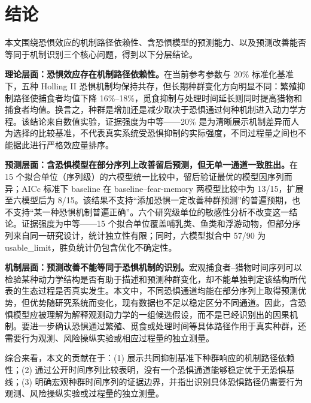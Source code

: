 \documentclass[12pt,a4paper]{ctexart}
\begin{document}
\section{结论}

本文围绕恐惧效应的机制路径依赖性、含恐惧模型的预测能力、以及预测改善能否等同于机制识别三个核心问题，得到以下分层结论。

\textbf{理论层面：恐惧效应存在机制路径依赖性。}在当前参考参数与 20\% 标准化基准下，五种 Holling II 恐惧机制均保持共存，但长期种群变化方向明显不同：繁殖抑制路径使捕食者均值下降 16\%--18\%，觅食抑制与处理时间延长则同时提高猎物和捕食者均值。换言之，种群是增加还是减少取决于恐惧通过何种机制进入动力学方程。该结论来自数值实验，证据强度为中等——20\% 是为清晰展示机制差异而人为选择的比较基准，不代表真实系统受恐惧抑制的实际强度，不同过程量之间也不能据此进行严格效应量排序。

\textbf{预测层面：含恐惧模型在部分序列上改善留后预测，但无单一通道一致胜出。}在 15 个拟合单位（序列级）的六模型统一比较中，留后验证最优的模型因序列而异；AICc 标准下 baseline 在 baseline--fear-memory 两模型比较中为 13/15，扩展至六模型后为 8/15。该结果不支持“添加恐惧一定改善种群预测”的普遍预期，也不支持“某一种恐惧机制普遍正确”。六个研究级单位的敏感性分析不改变这一结论。证据强度为中等——15 个拟合单位覆盖哺乳类、鱼类和浮游动物，但部分序列来自同一研究设计，统计独立性有限；同时，六模型拟合中 57/90 为 usable\_limit，胜负统计仍包含优化不确定性。

\textbf{机制层面：预测改善不能等同于恐惧机制的识别。}宏观捕食者--猎物时间序列可以检验某种动力学结构是否有助于描述和预测种群变化，却不能单独判定该结构所代表的生态过程是否真实发生。本文中，不同恐惧通道均能在部分序列上取得预测优势，但优势随研究系统而变化，现有数据也不足以稳定区分不同通道。因此，含恐惧模型应被理解为解释观测动力学的一组候选假设，而不是已经识别出的因果机制。要进一步确认恐惧通过繁殖、觅食或处理时间等具体路径作用于真实种群，还需要行为观测、风险操纵实验或相应过程量的独立测量。

综合来看，本文的贡献在于：(1) 展示共同抑制基准下种群响应的机制路径依赖性；(2) 通过公开时间序列比较表明，没有一个恐惧通道能够稳定优于无恐惧基线；(3) 明确宏观种群时间序列的证据边界，并指出识别具体恐惧路径仍需要行为观测、风险操纵实验或过程量的独立测量。
\end{document}

